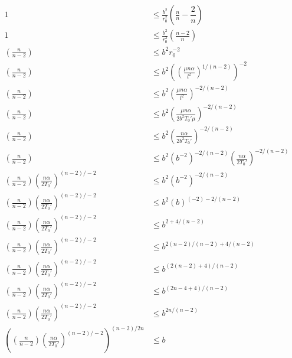 \documentclass[11pt]{article}
\numberwithin{equation}{section}
\begin{document}
\begin{align*}
1 &\le \frac{b^2}{r_0^2}\left(\frac{n}{n} -\dfrac{2}{n}\right)\\
1 &\le \frac{b^2}{r_0^2}\left(\frac{n-2}{n}\right)\\
\left(\frac{n}{n-2}\right) &\le {b^2}r_0^{-2}\\
\left(\frac{n}{n-2}\right) &\le {b^2}\left(\left(\frac{\mu n\alpha}{l^2}\right)^{1/(n-2)}\right)^{-2}\\
\left(\frac{n}{n-2}\right) &\le {b^2}\left(\frac{\mu n\alpha}{l^2}\right)^{-2/(n-2)}\\
\left(\frac{n}{n-2}\right) &\le {b^2}\left(\frac{\mu n\alpha}{2b^2T_0'\mu}\right)^{-2/(n-2)}\\
\left(\frac{n}{n-2}\right) &\le {b^2}\left(\frac{n\alpha}{2b^2T_0'}\right)^{-2/(n-2)}\\
\left(\frac{n}{n-2}\right) &\le {b^2}\left(b^{-2}\right)^{-2/(n-2)}\left(\frac{n\alpha}{2T_0'}\right)^{-2/(n-2)}\\
\left(\frac{n}{n-2}\right)\left(\frac{n\alpha}{2T_0'}\right)^{(n-2)/-2}&\le {b^2}\left(b^{-2}\right)^{-2/(n-2)}\\
\left(\frac{n}{n-2}\right)\left(\frac{n\alpha}{2T_0'}\right)^{(n-2)/-2}&\le {b^2}\left(b\right)^{(-2)-2/(n-2)}\\
\left(\frac{n}{n-2}\right)\left(\frac{n\alpha}{2T_0'}\right)^{(n-2)/-2}&\le b^{2+4/(n-2)}\\
\left(\frac{n}{n-2}\right)\left(\frac{n\alpha}{2T_0'}\right)^{(n-2)/-2}&\le b^{2(n-2)/(n-2)+4/(n-2)}\\
\left(\frac{n}{n-2}\right)\left(\frac{n\alpha}{2T_0'}\right)^{(n-2)/-2}&\le b^{(2(n-2)+4)/(n-2)}\\
\left(\frac{n}{n-2}\right)\left(\frac{n\alpha}{2T_0'}\right)^{(n-2)/-2}&\le b^{(2n-4+4)/(n-2)}\\
\left(\frac{n}{n-2}\right)\left(\frac{n\alpha}{2T_0'}\right)^{(n-2)/-2}&\le b^{2n/(n-2)}\\
\left(\left(\frac{n}{n-2}\right)\left(\frac{n\alpha}{2T_0'}\right)^{(n-2)/-2}\right)^{(n-2)/2n} &\le b\\
\end{align*}
\end{document}
